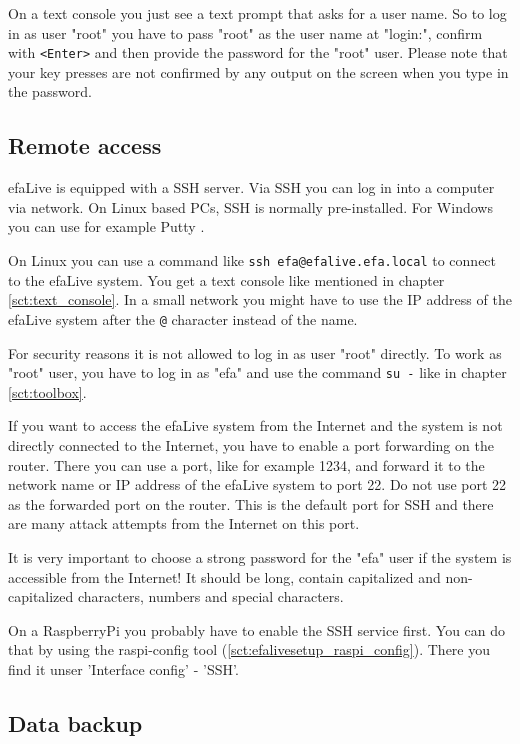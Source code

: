 \documentclass[a4paper,12pt,twoside]{article}
\begin{document}
On a text console you just see a text prompt that asks for a user name.
So to log in as user "root" you have to
pass "root" as the user name at
"login:", confirm with
\texttt{{\textless}Enter{\textgreater}} and then provide the password for the
"root" user. Please note that your key
presses are not confirmed by any output on the screen when you type in
the password.


\subsection{Remote access}
\label{sct:remote_access}
efaLive is equipped with a SSH server. Via SSH you can log in into a
computer via network. On Linux based PCs, SSH is normally
pre-installed. For Windows you can use for example Putty \cite{PUT1}.

On Linux you can use a command like \texttt{ssh
efa@efalive.efa.local} to connect to the efaLive system.
You get a text console like mentioned in chapter \ref{sct:text_console}. In a small
network you might have to use the IP address of the efaLive system
after the \texttt{@} character instead of the
name.

For security reasons it is not allowed to log in as user
"root" directly. To work as
"root" user, you have to log in as
"efa" and use the command \texttt{su -} like in chapter \ref{sct:toolbox}.

If you want to access the efaLive system from the Internet and the
system is not directly connected to the Internet, you have to enable a
port forwarding on the router. There you can use a port, like for
example 1234, and forward it to the network name or IP address of the
efaLive system to port 22. Do not use port 22 as the forwarded port on
the router. This is the default port for SSH and there are many attack
attempts from the Internet on this port.

It is very important to choose a strong password for the
"efa" user if the system is accessible from
the Internet! It should be long, contain capitalized and
non-capitalized characters, numbers and special characters.

On a RaspberryPi you probably have to enable the SSH service first. You
can do that by using the raspi-config tool (\ref{sct:efalivesetup_raspi_config}). There 
you find it unser 'Interface config' - 'SSH'.
  

\subsection{Data backup}
\label{sct:data_backup}
\end{document}
